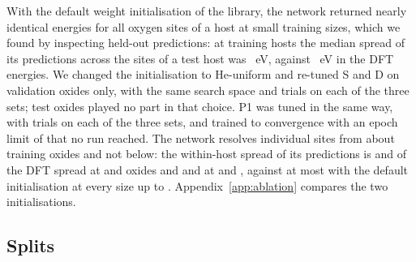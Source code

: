 With the default weight initialisation of the library, the network returned nearly identical energies for all oxygen sites of a host at small training sizes, which we found by inspecting held-out predictions: at \numCfgBudgetsHostsItemFour{} training hosts the median spread of its predictions across the sites of a test host was \numSSiteResolutionForensicCheckpointsSTwoHundredFlagSweepTrainedMedianSdLabelled{}~eV, against \numSSiteResolutionForensicCheckpointsSTwoHundredFlagSweepTrainedMedianTargetSd{}~eV in the DFT energies. We changed the initialisation to He-uniform \citep{He2015delving} and re-tuned S and D on validation oxides only, with the same search space and \numCfgTuningOptunaTrialsPerModelPerAnchor{} trials on each of the three sets; test oxides played no part in that choice. P1 was tuned in the same way, with \numNetStgPOneTunedSixHundredFiftyFourTrials{} trials on each of the three sets, and trained to convergence with an epoch limit of \numNetStgPOneMaxEpochs{} that no run reached. The network resolves individual sites from about \numCfgBudgetsHostsItemThree{} training oxides and not below: the within-host spread of its predictions is \numNetSpreadRatioSTwentyFive{} and \numNetSpreadRatioSFifty{} of the DFT spread at \numCfgBudgetsHostsItemOne{} and \numCfgBudgetsHostsItemTwo{} oxides and \numNetSpreadRatioSOneHundred{} and \numNetSpreadRatioSTwoHundred{} at \numCfgBudgetsHostsItemThree{} and \numCfgBudgetsHostsItemFour{}, against at most \numAblSpreadRatioSFifty{} with the default initialisation at every size up to \numCfgBudgetsHostsItemFour{}. Appendix~\ref{app:ablation} compares the two initialisations.

\subsection{Splits}
\label{sec:splits}

